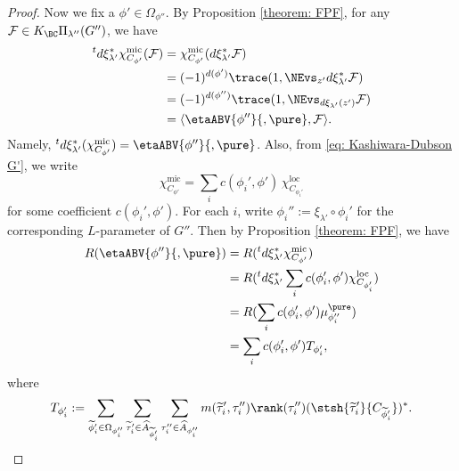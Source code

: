 \documentclass[11pt,letterpaper]{amsart}
\numberwithin{equation}{section}
\begin{document}
\begin{proof}
Now we fix a $\phi' \in \Omega_{\phi''}$. By Proposition \ref{theorem: FPF}, for any $\mathcal{F} \in K_{\BC}\Pi_{\lambda''}(G'')$, we have
\begin{align*}
    {}^td\xi_{\lambda'}^{\ast}\chi_{C_{\phi'}}^{\textrm{mic}}(\mathcal{F})&= \chi_{C_{\phi'}}^{\textrm{mic}}(d\xi_{\lambda'}^{\ast}\mathcal{F})\\
    &=(-1)^{d(\phi')} \trace(1, \NEvs_{z'} d\xi_{\lambda'}^{\ast}\mathcal{F})\\
    &= (-1)^{d(\phi'')} \trace(1, \NEvs_{d\xi_{\lambda'}(z')} \mathcal{F})\\
    &= \langle \etaABV{\phi''}{,\pure}, \mathcal{F} \rangle.
\end{align*}
Namely, $ {}^td\xi_{\lambda'}^{\ast}( \chi_{C_{\phi'}}^{\textrm{mic}})= \etaABV{\phi''}{,\pure}$. Also, from \eqref{eq: Kashiwara-Dubson G'}, we write
\[\chi^\textrm{mic}_{C_{\phi'}} = \sum_{i} c(\phi_i',\phi')\, \chi^\textrm{loc}_{C_{\phi_i'}}\]
for some coefficient $c(\phi_i', \phi').$ For each $i$, write $\phi_i'':= \xi_{\lambda'} \circ \phi_i'$ for the corresponding $L$-parameter of $G''$.
Then by Proposition \ref{theorem: FPF}, we have
\begin{align*}
    R(\etaABV{\phi''}{,\pure})&= R( {}^t d \xi_{\lambda'}^{\ast} \chi_{C_{\phi'}}^{\textrm{mic}})\\
    &=R( {}^t d \xi_{\lambda'}^{\ast} \sum_{i}c(\phi_i', \phi') \chi^\textrm{loc}_{C_{\phi_i'}} )\\
    &= R( \sum_{i}c(\phi_i', \phi') \mu_{\phi_i''}^{\pure} )\\
    &=\sum_{i}c(\phi_i', \phi') T_{\phi_{i}'},
\end{align*}
where 
\[T_{\phi_{i}'}:= \sum_{\widetilde{\phi}_i'\in \Omega_{\phi_i''}} \sum_{\widetilde{\tau}_i' \in \widehat{A}_{\widetilde{\phi}_i'}} \sum_{{\tau}_i'' \in \widehat{A}_{\phi_i''}} m(\widetilde{\tau}_i', \tau_i'') \rank(\tau_i'') (\stsh{\widetilde{\tau}_i'}{C_{\widetilde{\phi}_i'}})^{\ast}.\]


\end{proof}
\end{document}
